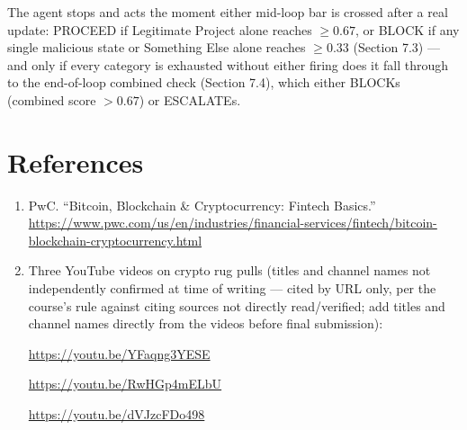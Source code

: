 \documentclass[11pt]{article}
\begin{document}
The agent stops and acts the moment either mid-loop bar is crossed after a real update: PROCEED if Legitimate Project alone reaches $\geq0.67$, or BLOCK if any single malicious state or Something Else alone reaches $\geq0.33$ (Section 7.3) --- and only if every category is exhausted without either firing does it fall through to the end-of-loop combined check (Section 7.4), which either BLOCKs (combined score $>0.67$) or ESCALATEs.

\section*{References}

\begin{enumerate}
    \item PwC. ``Bitcoin, Blockchain \& Cryptocurrency: Fintech Basics.''\\
    \url{https://www.pwc.com/us/en/industries/financial-services/fintech/bitcoin-blockchain-cryptocurrency.html}

    \item Three YouTube videos on crypto rug pulls (titles and channel names not independently confirmed at time of writing --- cited by URL only, per the course's rule against citing sources not directly read/verified; add titles and channel names directly from the videos before final submission):

    \url{https://youtu.be/YFaqng3YESE}

    \url{https://youtu.be/RwHGp4mELbU}

    \url{https://youtu.be/dVJzcFDo498}
\end{enumerate}
\end{document}
